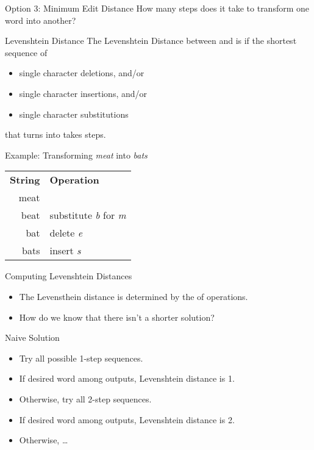 \documentclass[professionalfonts, xcolor={usenames,svgnames,x11names,table}]{beamer}
\begin{document}
\begin{frame}{Option 3: Minimum Edit Distance}
    How many steps does it take to transform one word into another?
    \begin{block}{Levenshtein Distance}
        The Levenshtein Distance between  and  is  if the shortest sequence of
        \begin{itemize}
            \item single character deletions, and\slash or
            \item single character insertions, and\slash or
            \item single character substitutions
        \end{itemize}
        that turns  into  takes  steps.
    \end{block}
    \begin{exampleblock}{Example: Transforming \emph{meat} into \emph{bats}}
        \centering
        \begin{tabular}{rl}
            \textbf{String} & \textbf{Operation}\\
            meat & \\
            beat & substitute \emph{b} for \emph{m}\\
            bat  & delete \emph{e}\\
            bats & insert \emph{s}
        \end{tabular}
    \end{exampleblock}
\end{frame}

\begin{frame}{Computing Levenshtein Distances}
    \begin{itemize}
        \item The Levensthein distance is determined by the  of operations.
        \item How do we know that there isn't a shorter solution?
    \end{itemize}    

    \begin{block}{Naive Solution}
        \begin{itemize}
            \item Try all possible 1-step sequences.
            \item If desired word among outputs, Levenshtein distance is 1.
            \item Otherwise, try all 2-step sequences.
            \item If desired word among outputs, Levenshtein distance is 2.
            \item Otherwise, \ldots
        \end{itemize}
    \end{block}
\end{frame}
\end{document}
